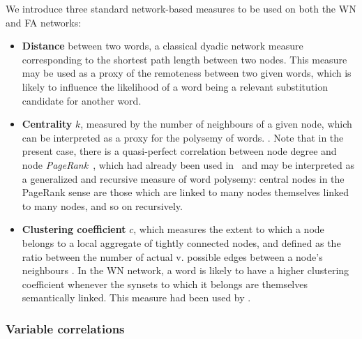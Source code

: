\bigskip
We introduce three standard network-based measures to be used on both the WN and FA networks:

\begin{itemize}
    \item \textbf{Distance} between two words, a classical dyadic network measure corresponding to the shortest path length between two nodes.
    This measure may be used as a proxy of the remoteness between two given words, which is likely to influence the likelihood of a word being a relevant substitution candidate for another word.
    \item \textbf{Centrality} $k$, measured by the number of neighbours of a given node, which can be interpreted as a proxy for the polysemy of words.
    .
    Note that in the present case, there is a quasi-perfect correlation between node degree and node \emph{PageRank}~\citep{Page99}, which had already been used in~\citet{Griffiths07} and may be interpreted as a generalized and recursive measure of word polysemy: central nodes in the PageRank sense are those which are linked to many nodes themselves linked to many nodes, and so on recursively.
    \item \textbf{Clustering coefficient} $c$, which measures the extent to which a node belongs to a local aggregate of tightly connected nodes, and defined as the ratio between the number of actual v. possible edges between a node's neighbours \cite{watt-coll}.
    In the WN network, a word is likely to have a higher clustering coefficient whenever the synsets to which it belongs are themselves semantically linked.
    This measure had been used by \citet{Chan10}.
\end{itemize}


\subsubsection{Variable correlations}


